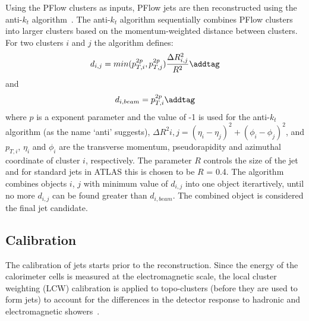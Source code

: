 Using the PFlow clusters as inputs, PFlow jets are then reconstructed
using the anti-$k_t$ algorithm~\cite{Cacciari_2008}. 
The anti-$k_t$ algorithm 
sequentially combines PFlow clusters into larger clusters based on the 
momentum-weighted distance between clusters. 
For two clusters $i$ and $j$ the algorithm defines:
\[  d_{i,j} = min(p_{T,i}^{2p},p_{T,j}^{2p}) \frac{\Delta R_{i,j}^2}{R^2}   \addtag \]
and 
\[ d_{i,beam} = p_{T,i}^{2p}   \addtag \]
where $p$ is a exponent parameter and the value of -1 is used
for the anti-$k_t$ algorithm (as the name `anti' suggests),
$\Delta R^2{i,j} = (\eta_i - \eta_j)^2 + (\phi_i - \phi_j)^2 $, 
and $p_{T,i}$, $\eta_i$ and $\phi_i$ are 
the transverse momentum, 
pseudorapidity and azimuthal coordinate
of cluster $i$, respectively. 
The parameter $R$ controls the size of the jet and for standard jets 
in ATLAS this is chosen to be $R$ = 0.4.
The algorithm combines objects $i$, $j$ with minimum value of $d_{i,j}$
into one object iterartively, until no more $d_{i,j}$ can be found greater
than $d_{i,beam}$. The combined object is considered the final jet 
candidate.
\subsection{Calibration}
The calibration of jets starts prior to the reconstruction.
Since the energy of the calorimeter cells is measured at 
the electromagnetic scale, the local cluster weighting 
(LCW) calibration is applied to topo-clusters (before they are
used to form jets) to account for the differences in 
the detector response to hadronic and 
electromagnetic showers~\cite{CERN-PH-EP-2015-304}.

